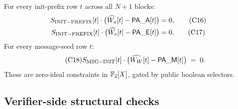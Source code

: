 For every init-prefix row $t$ across all $N+1$ blocks:
\begin{align}
S_{\mathrm{INIT-PREFIX}}[t] \cdot \bigl(\widehat{W_a}[t] - \mathsf{PA\_A}[t]\bigr) &= 0, \tag{C16}\label{con:init-a}\\
S_{\mathrm{INIT-PREFIX}}[t] \cdot \bigl(\widehat{W_e}[t] - \mathsf{PA\_E}[t]\bigr) &= 0. \tag{C17}\label{con:init-e}
\end{align}
For every message-seed row $t$:
\begin{equation}\tag{C18}\label{con:msg-init}
S_{\mathrm{MSG-INIT}}[t] \cdot \bigl(\widehat{W_W}[t] - \mathsf{PA\_M}[t]\bigr) \;=\; 0.
\end{equation}
These are zero-ideal constraints in $\mathbb{F}_2[X]$, gated by public boolean
selectors.

\subsection{Verifier-side structural checks}\label{cons:public-checks}

